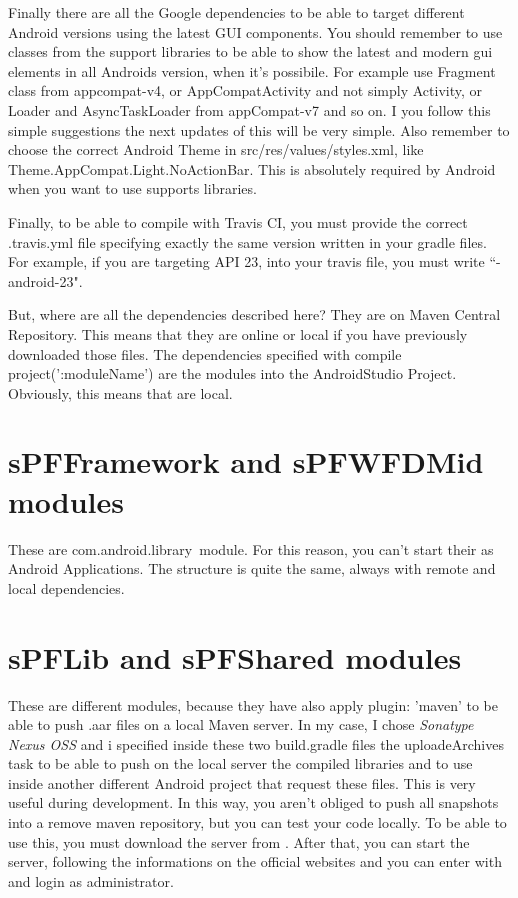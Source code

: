 Finally there are all the Google dependencies to be able to target different Android versions using the latest GUI components. You should remember to use classes from the support libraries to be able to show the latest and modern gui  elements in all Androids version, when it's possibile. For example use Fragment class from appcompat-v4, or AppCompatActivity and not simply Activity, or Loader and AsyncTaskLoader from appCompat-v7 and so on. I you follow this simple suggestions the next updates of this  will be very simple.
Also remember to choose the correct Android Theme in src/res/values/styles.xml, like Theme.AppCompat.Light.NoActionBar. This is absolutely required by Android when you want to use supports libraries.

Finally, to be able to compile with Travis CI, you must provide the correct .travis.yml file specifying exactly the same version written in your gradle files. For example, if you are targeting API 23, into your travis file, you must write ``- android-23".

But, where are all the dependencies described here? They are on Maven Central Repository. This means that they are online or local if you have previously downloaded those files. The dependencies specified with \textsf{compile project(':moduleName')} are the modules into the AndroidStudio Project. Obviously, this means that are local.

\section*{sPFFramework and sPFWFDMid modules}
These are \textsf{com.android.library} module. For this reason, you can't start their as Android Applications. The structure is quite the same, always with remote and local dependencies.

\section*{sPFLib and sPFShared modules}
These are different modules, because they have also \textsf{apply plugin: 'maven'} to be able to push \textsf{.aar} files on a local Maven server.
In my case, I chose \emph{Sonatype Nexus OSS} and i specified inside these two \textsf{build.gradle} files the \textsf{uploadeArchives} task to be able to push on the local server the compiled libraries and to use inside another different Android project that request these files.
This is very useful during development. In this way, you aren't obliged to push all snapshots into a remove maven repository, but you can test your code locally. To be able to use this, you must download the server from . 
After that, you can start the server, following the informations on the official websites and you can enter with  and login as administrator.

